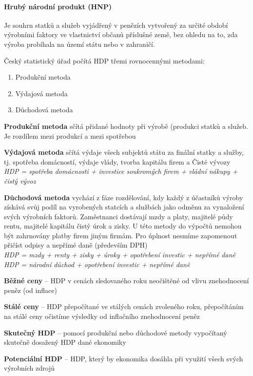 \paragraph{Hrubý národní produkt (HNP)}
Je souhrn statků a služeb vyjádřený v penězích vytvořený za určité období výrobními faktory
ve vlastnictví občanů příslušné země, bez ohledu na to, zda výroba probíhala na území státu
nebo v zahraničí.

Český statistický úřad počítá HDP třemi rovnocennými metodami:
\begin{enumerate}
    \item Produkční metoda
    \item Výdajová metoda
    \item Důchodová metoda
\end{enumerate}

\textbf{Produkční metoda} sčítá přidané hodnoty při výrobě (produkci statků a služeb. Je rozdílem mezi produkcí a mezi spotřebou

\textbf{Výdajová metoda} sčítá výdaje všech subjektů státu za finální statky a služby, tj. spotřeba domácností, výdaje vlády, tvorba kapitálu firem a Čisté vývozy \\
\textit{HDP = spotřeba domácnosti + investice soukromých firem + vládní nákupy + čistý vývoz}

\textbf{Důchodová metoda} vychází z fáze rozdělování, kdy každý z účastníků výroby získává svůj podíl na vyrobených statcích a službách jako odměnu za vynaložení svých výrobních faktorů. Zaměstnanci dostávají mzdy a platy, majitelé půdy rentu, majitelé kapitálu čistý úrok a zisky. U této metody do výpočtů nemohou být zahrnovány platby firem jiným firmám. Pro úplnost nesmíme zapomenout přičíst odpisy a nepřímé daně (především DPH) \\
\textit{HDP = mzdy + renty + zisky + úroky + opotřebení investic + nepřímé daně} \\
\textit{HDP = národní důchod + opotřebení investic + nepřímé daně}

\textbf{Běžné ceny} -- HDP v cenách sledovaného roku neočištěné od vlivu znehodnocení peněz (od inflace)

\textbf{Stálé ceny} -- HDP přepočítané ve stálých cenách zvoleného roku, přepočítáním na stálé ceny očistíme výsledky od inflačního znehodnocení peněz

\textbf{Skutečný HDP} -- pomocí produkční nebo důchodové metody vypočítaný skutečně dosažený HDP dané ekonomiky

\textbf{Potenciální HDP} -- HDP, který by ekonomika dosáhla při využití všech svých výrobních zdrojů

